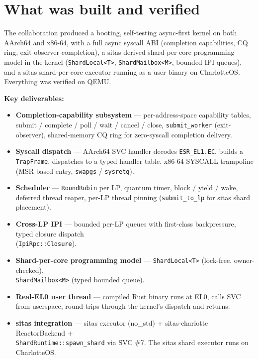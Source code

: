 \section{What was built and verified}

The collaboration produced a booting, self-testing async-first kernel on both
AArch64 and x86-64, with a full async syscall ABI (completion capabilities, CQ
ring, exit-observer completion), a sitas-derived shard-per-core programming
model in the kernel (\texttt{ShardLocal<T>}, \texttt{ShardMailbox<M>}, bounded
IPI queues), and a sitas shard-per-core executor running as a user binary on
CharlotteOS. Everything was verified on QEMU.

\textbf{Key deliverables:}

\begin{itemize}
    \item \textbf{Completion-capability subsystem} --- per-address-space
        capability tables, submit / complete / poll / wait / cancel / close,
        \texttt{submit\_worker} (exit-observer), shared-memory CQ ring for
        zero-syscall completion delivery.
    \item \textbf{Syscall dispatch} --- AArch64 SVC handler decodes
        \texttt{ESR\_EL1.EC}, builds a \texttt{TrapFrame}, dispatches to a
        typed handler table. x86-64 SYSCALL trampoline (MSR-based entry,
        \texttt{swapgs} / \texttt{sysretq}).
    \item \textbf{Scheduler} --- \texttt{RoundRobin} per LP, quantum timer,
        block / yield / wake, deferred thread reaper, per-LP thread pinning
        (\texttt{submit\_to\_lp} for sitas shard placement).
    \item \textbf{Cross-LP IPI} --- bounded per-LP queues with first-class
        backpressure, typed closure dispatch \\ (\texttt{IpiRpc::Closure}).
    \item \textbf{Shard-per-core programming model} ---
        \texttt{ShardLocal<T>} (lock-free, owner-checked), \\
        \texttt{ShardMailbox<M>} (typed bounded queue).
    \item \textbf{Real-EL0 user thread} --- compiled Rust binary runs at EL0,
        calls SVC from userspace, round-trips through the kernel's dispatch
        and returns.
    \item \textbf{sitas integration} --- sitas executor (no\_std) +
        sitas-charlotte ReactorBackend + \\ \texttt{ShardRuntime::spawn\_shard}
        via SVC \#7. The sitas shard executor runs on CharlotteOS.
\end{itemize}

